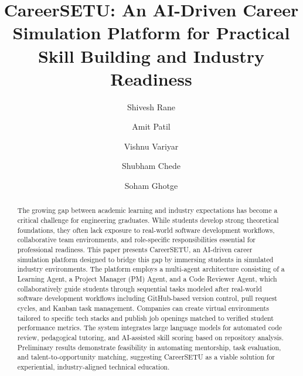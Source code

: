 \documentclass[runningheads]{llncs}
\begin{document}
\title{CareerSETU: An AI-Driven Career Simulation Platform for Practical Skill Building and Industry Readiness}


\author{Shivesh Rane \and
Amit Patil \and
Vishnu Variyar \and
Shubham Chede \and
Soham Ghotge}



\maketitle

\begin{abstract}
The growing gap between academic learning and industry expectations has become a critical challenge for engineering graduates. While students develop strong theoretical foundations, they often lack exposure to real-world software development workflows, collaborative team environments, and role-specific responsibilities essential for professional readiness. This paper presents CareerSETU, an AI-driven career simulation platform designed to bridge this gap by immersing students in simulated industry environments. The platform employs a multi-agent architecture consisting of a Learning Agent, a Project Manager (PM) Agent, and a Code Reviewer Agent, which collaboratively guide students through sequential tasks modeled after real-world software development workflows including GitHub-based version control, pull request cycles, and Kanban task management. Companies can create virtual environments tailored to specific tech stacks and publish job openings matched to verified student performance metrics. The system integrates large language models for automated code review, pedagogical tutoring, and AI-assisted skill scoring based on repository analysis. Preliminary results demonstrate feasibility in automating mentorship, task evaluation, and talent-to-opportunity matching, suggesting CareerSETU as a viable solution for experiential, industry-aligned technical education.

\end{abstract}
\end{document}
